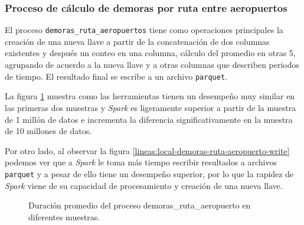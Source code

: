 \subsubsection{Proceso de cálculo de demoras por ruta entre aeropuertos}

El proceso \texttt{demoras\_ruta\_aeropuertos} tiene como operaciones principales  la creación de una nueva llave a partir de la concatenación de dos columnas existentes y después un conteo en una columna, cálculo del promedio en otras 5, agrupando de acuerdo a la nueva llave y a otras columnas que describen periodos de tiempo. El resultado final se escribe a un archivo \texttt{parquet}.

La figura \ref{lineas:local-demoras-ruta-aeropuerto} muestra como las herramientas tienen un desempeño muy similar en las primeras dos muestras y \textit{Spark} es ligeramente superior a partir de la muestra de 1 millón de datos e incrementa la diferencia significativamente en la muestra de 10 millones de datos. 

Por otro lado, al observar la figura \ref{lineas:local-demoras-ruta-aeropuerto-write} podemos ver que a \textit{Spark} le toma más tiempo escribir resultados a archivos \texttt{parquet} y a pesar de ello tiene un desempeño superior, por lo que la rapidez de \textit{Spark} viene de su capacidad de procesamiento y creación de una nueva llave.

\begin{figure}
\centering
{}
\caption{Duración promedio del proceso demoras\_ruta\_aeropuerto en diferentes muestras.}
\label{lineas:local-demoras-ruta-aeropuerto}
\end{figure}

